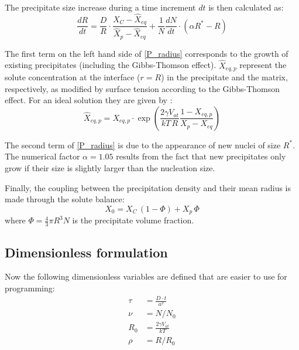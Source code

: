 \documentclass[12pt,a4paper]{article}
\begin{document}
The precipitate size increase during a time increment $dt$ is then calculated as:
\begin{equation}
\label{P_radius}
\frac{dR}{dt} = \frac{D}{R} \cdot \frac{X_C - \hat{X}_{eq}}{\hat{X}_p - \hat{X}_{eq}} + \frac{1}{N}\frac{dN}{dt} \cdot (\alpha R^* - R)
\end{equation}

The first term on the left hand side of \eqref{P_radius} corresponds to the growth of existing precipitates (including the Gibbs-Thomson effect). $\hat{X}_{eq,p}$ represent the solute concentration at the interface ($r=R$) in the precipitate and the matrix, respectively, as modified by surface tension according to the Gibbs-Thomson effect. For an ideal solution they are given by \citep{Wagner-2005-HomogeneousSecond-P,Calderon-1994-Ostwaldripeningin}:
\begin{equation}
\hat{X}_{eq,p} =  X_{eq,p} \cdot \exp \left( \frac{2\gamma V_{at}}{kT\, R} \frac{1-X_{eq,p}}{X_p - X_{eq}}\right) 
\end{equation}

The second term of \eqref{P_radius} is due to the appearance of new nuclei of
size $R^*$. The numerical factor $\alpha = 1.05$ results from the fact that new precipitates only grow if their size is slightly larger than the nucleation size. 

Finally, the coupling between the precipitation density and their mean radius is made through the solute balance:
\begin{equation}
X_0 = X_C\,(1-\Phi) + X_p\,\Phi
\end{equation}
where $\Phi=\frac{4}{3}\pi R^3 N$ is the precipitate volume fraction.

\subsection{Dimensionless formulation}
Now the following dimensionless variables are defined that are easier to use for programming:
\begin{subequations}
	\begin{align}
\tau &= \frac{D\cdot t}{a^2} \\
\nu &= N / N_0 \\
R_0 &= \frac{2\gamma V_{at}}{kT} \\
\rho &= R/R_0
	\end{align}
\end{subequations}
\end{document}
